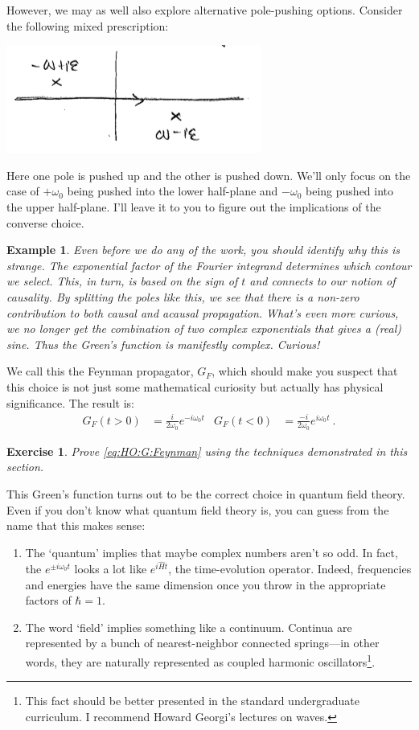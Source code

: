 \documentclass[
  11pt,
	colorful,
	raggedright,
]{tufte-style-thesis-flip}
\newtheorem{exercise}{Exercise}[section]
\newtheorem{example}{Example}[section]
\begin{document}
However, we may as well also explore alternative pole-pushing options. Consider the following mixed prescription:
\begin{center}
\includegraphics[width=.6\textwidth]{figures/Lec_2017_16_Feynman.png}
\end{center}
Here one pole is pushed up and the other is pushed down. We'll only focus on the case of $+\omega_0$ being pushed into the lower half-plane and $-\omega_0$ being pushed into the upper half-plane. I'll leave it to you to figure out the implications of the converse choice.
\begin{example}
Even before we do any of the work, you should identify why this is strange. The exponential factor of the Fourier integrand determines which contour we select. This, in turn, is based on the sign of $t$ and connects to our notion of causality. By splitting the poles like this, we see that there is a non-zero contribution to \emph{both} causal and acausal propagation. What's even more curious, we no longer get the combination of two complex exponentials that gives a (real) sine. Thus the Green's function is manifestly complex. Curious!
\end{example}
We call this the Feynman propagator, $G_F$, which should make you suspect that this choice is not just some mathematical curiosity but actually has physical significance. The result is:
\begin{align}
  G_F(t>0) &= \frac{i}{2\omega_0} e^{-i\omega_0 t}
  &
  G_F(t<0) &= \frac{-i}{2\omega_0} e^{i\omega_0 t} \ .
  \label{eq:HO:G:Feynman}
\end{align}
\begin{exercise}
Prove \eqref{eq:HO:G:Feynman} using the techniques demonstrated in this section.
\end{exercise}
This Green's function turns out to be the correct choice in quantum field theory. Even if you don't know what quantum field theory is, you can guess from the name that this makes sense:
\begin{enumerate}
\item The `quantum' implies that maybe complex numbers aren't so odd. In fact, the $e^{\pm i\omega_0 t}$ looks a lot like $e^{i\hat H t}$, the time-evolution operator. Indeed, frequencies and energies have the same dimension once you throw in the appropriate factors of $\hbar = 1$.
\item The word `field' implies something like a continuum. Continua are represented by a bunch of nearest-neighbor connected springs---in other words, they are naturally represented as coupled harmonic oscillators\footnote{This fact should be better presented in the standard undergraduate curriculum. I recommend Howard Georgi's lectures on waves.}.
\end{enumerate}
\end{document}
